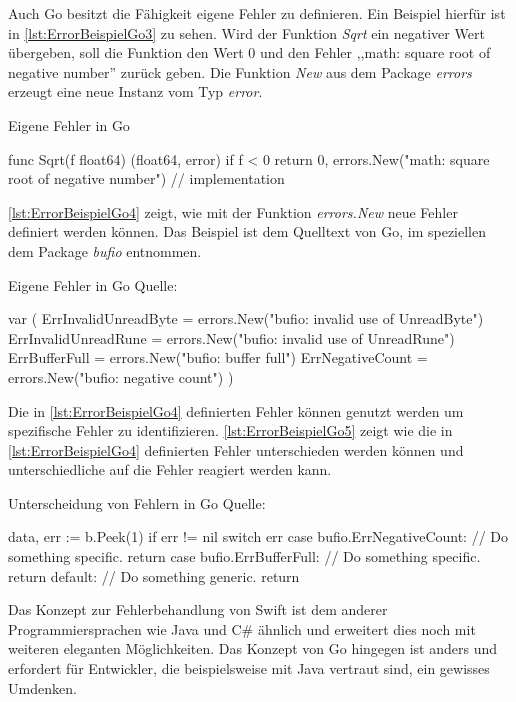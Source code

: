 Auch Go besitzt die Fähigkeit eigene Fehler zu definieren.
Ein Beispiel hierfür ist in \autoref{lst:ErrorBeispielGo3} zu sehen.
Wird der Funktion \textit{Sqrt} ein negativer Wert übergeben, soll die Funktion den Wert 0 und den Fehler ,,math: square root of negative number'' zurück geben. 
Die Funktion \textit{New} aus dem Package \textit{errors} erzeugt eine neue Instanz vom Typ \textit{error}.

\begin{listing}[H]
\caption{Eigene Fehler in Go \cite[]{GoBlog.ErroHandling}}
\label{lst:ErrorBeispielGo3}
\begin{GoCode}
func Sqrt(f float64) (float64, error) {
    if f < 0 {
        return 0, errors.New("math: square root of negative number")
    }
    // implementation
}
\end{GoCode}
\end{listing}

\autoref{lst:ErrorBeispielGo4} zeigt, wie mit der Funktion \textit{errors.New} neue Fehler definiert werden können. 
Das Beispiel ist dem Quelltext von Go, im speziellen dem Package \textit{bufio} entnommen.

\begin{listing}[H]
\caption{Eigene Fehler in Go Quelle: \cite[]{GolangBufio}}
\label{lst:ErrorBeispielGo4}
\begin{GoCode}
var (
    ErrInvalidUnreadByte = errors.New("bufio: invalid use of UnreadByte")
    ErrInvalidUnreadRune = errors.New("bufio: invalid use of UnreadRune")
    ErrBufferFull        = errors.New("bufio: buffer full")
    ErrNegativeCount     = errors.New("bufio: negative count")
)
\end{GoCode}
\end{listing}

Die in \autoref{lst:ErrorBeispielGo4} definierten Fehler können genutzt werden um spezifische Fehler zu identifizieren. 
\autoref{lst:ErrorBeispielGo5} zeigt wie die in \autoref{lst:ErrorBeispielGo4} definierten Fehler unterschieden werden können und unterschiedliche auf die Fehler reagiert werden kann.

\begin{listing}[H]
\caption{Unterscheidung von Fehlern in Go Quelle: \cite[]{GoingGo.Error1}}
\label{lst:ErrorBeispielGo5}
\begin{GoCode}
data, err := b.Peek(1)
if err != nil {
    switch err {
        case bufio.ErrNegativeCount:
            // Do something specific.
            return
        case bufio.ErrBufferFull:
            // Do something specific.
            return
        default:
            // Do something generic.
            return
    }
}
\end{GoCode}
\end{listing}



Das Konzept zur Fehlerbehandlung von Swift ist dem anderer Programmiersprachen wie Java und C\# ähnlich und erweitert dies noch mit weiteren eleganten Möglichkeiten.
Das Konzept von Go hingegen ist anders und erfordert für Entwickler, die beispielsweise mit Java vertraut sind, ein gewisses Umdenken. 
